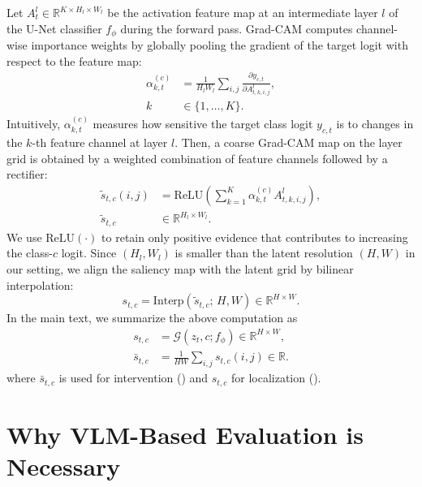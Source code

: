 Let $A_t^l\in\mathbb{R}^{K\times H_l\times W_l}$ be the activation feature map at an intermediate layer $l$ of the U-Net classifier $f_{\phi}$ during the forward pass. Grad-CAM computes channel-wise importance weights by globally pooling the gradient of the target logit with respect to the feature map:
\begin{equation}
\begin{aligned}
\alpha_{k,t}^{(c)}
&= \frac{1}{H_lW_l}\sum_{i,j}
\frac{\partial y_{c,t}}{\partial A_{t,k,i,j}^l}, \\
k &\in\{1,\dots,K\}.
\end{aligned}
\end{equation}
Intuitively, $\alpha_{k,t}^{(c)}$ measures how sensitive the target class logit $y_{c,t}$ is to changes in the $k$-th feature channel at layer $l$. Then, a coarse Grad-CAM map on the layer grid is obtained by a weighted combination of feature channels followed by a rectifier:
\begin{equation}
\begin{aligned}
\tilde{s}_{t,c}(i,j)
&= \mathrm{ReLU}\!\left(\sum_{k=1}^{K}\alpha_{k,t}^{(c)} A_{t,k,i,j}^l\right), \\
\tilde{s}_{t,c}
&\in \mathbb{R}^{H_l\times W_l}.
\end{aligned}
\end{equation}
We use $\mathrm{ReLU}(\cdot)$ to retain only positive evidence that contributes to increasing the class-$c$ logit. Since $(H_l,W_l)$ is smaller than the latent resolution $(H,W)$ in our setting, we align the saliency map with the latent grid by bilinear interpolation:
\begin{equation}
s_{t,c}=\mathrm{Interp}\!\left(\tilde{s}_{t,c};\,H,W\right)\in\mathbb{R}^{H\times W}.
\end{equation}
In the main text, we summarize the above computation as
\begin{equation}
\begin{aligned}
s_{t,c}
&= \mathcal{G}(z_t,c;f_\phi)\in\mathbb{R}^{H\times W}, \\
\bar{s}_{t,c}
&= \frac{1}{HW}\sum_{i,j}s_{t,c}(i,j)\in\mathbb{R}.
\end{aligned}
\end{equation}
where $\bar{s}_{t,c}$ is used for intervention () and $s_{t,c}$ for localization ().
\section{Why VLM-Based Evaluation is Necessary}
\label{app:vlm_eval}

